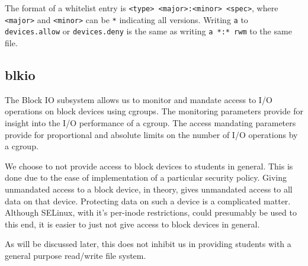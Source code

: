 The format of a whitelist entry is \texttt{<type> <major>:<minor> <spec>},
where \texttt{<major>} and \texttt{<minor>} can be \texttt{*} indicating all
versions. Writing \texttt{a} to \texttt{devices.allow} or \texttt{devices.deny}
is the same as writing \texttt{a *:* rwm} to the same file.

\subsection{blkio}

The Block IO subsystem allows us to monitor and mandate access to I/O
operations on block devices using cgroups\cite{blkio-controller.txt}. The
monitoring parameters provide for insight into the I/O performance of a cgroup.
The access mandating parameters provide for proportional and absolute limits on
the number of I/O operations by a cgroup.

We choose to not provide access to block devices to students in general. This
is done due to the ease of implementation of a particular security policy.
Giving unmandated access to a block device, in theory, gives unmandated access
to all data on that device. Protecting data on such a device is a complicated
matter. Although SELinux, with it's per-inode restrictions, could presumably be
used to this end, it is easier to just not give access to block devices in
general.

As will be discussed later, this does not inhibit us in providing students with
a general purpose read/write file system.
